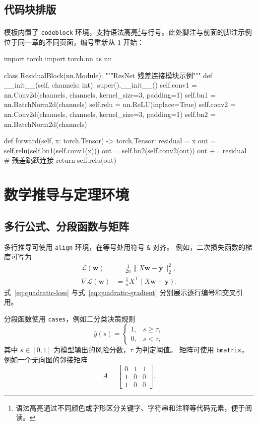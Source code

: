 \subsection{代码块排版}
模板内置了 \texttt{codeblock} 环境，支持语法高亮\footnote{语法高亮通过不同颜色或字形区分关键字、字符串和注释等代码元素，便于阅读。}与行号。此处脚注与前面的脚注示例位于同一章的不同页面，编号重新从 1 开始：

\begin{codeblock}[language=Python]
import torch
import torch.nn as nn

class ResidualBlock(nn.Module):
    """ResNet 残差连接模块示例"""
    def __init__(self, channels: int):
        super().__init__()
        self.conv1 = nn.Conv2d(channels, channels, kernel_size=3, padding=1)
        self.bn1 = nn.BatchNorm2d(channels)
        self.relu = nn.ReLU(inplace=True)
        self.conv2 = nn.Conv2d(channels, channels, kernel_size=3, padding=1)
        self.bn2 = nn.BatchNorm2d(channels)

    def forward(self, x: torch.Tensor) -> torch.Tensor:
        residual = x
        out = self.relu(self.bn1(self.conv1(x)))
        out = self.bn2(self.conv2(out))
        out += residual  # 残差跳跃连接
        return self.relu(out)
\end{codeblock}

\section{数学推导与定理环境}

\subsection{多行公式、分段函数与矩阵}

多行推导可使用 \texttt{align} 环境，在等号处用符号 \texttt{\&} 对齐。
例如，二次损失函数的梯度可写为
\begin{align}
\mathcal{L}(\boldsymbol{w})
  &= \frac{1}{2n}\lVert X\boldsymbol{w}-\boldsymbol{y}\rVert_2^2,
  \label{eq:quadratic-loss} \\
\nabla\mathcal{L}(\boldsymbol{w})
  &= \frac{1}{n}X^{\mathsf{T}}(X\boldsymbol{w}-\boldsymbol{y}).
  \label{eq:quadratic-gradient}
\end{align}
式~\eqref{eq:quadratic-loss} 与式~\eqref{eq:quadratic-gradient} 分别展示逐行编号和交叉引用。

分段函数使用 \texttt{cases}，例如二分类决策规则
\begin{equation}
\widehat{y}(s)=
\begin{cases}
1, & s\geq\tau, \\
0, & s<\tau,
\end{cases}
\label{eq:threshold-rule}
\end{equation}
其中 $s\in[0,1]$ 为模型输出的风险分数，$\tau$ 为判定阈值。
矩阵可使用 \texttt{bmatrix}，例如一个无向图的邻接矩阵
\begin{equation}
A=\begin{bmatrix}
0 & 1 & 1 \\
1 & 0 & 0 \\
1 & 0 & 0
\end{bmatrix}.
\label{eq:adjacency-matrix}
\end{equation}

